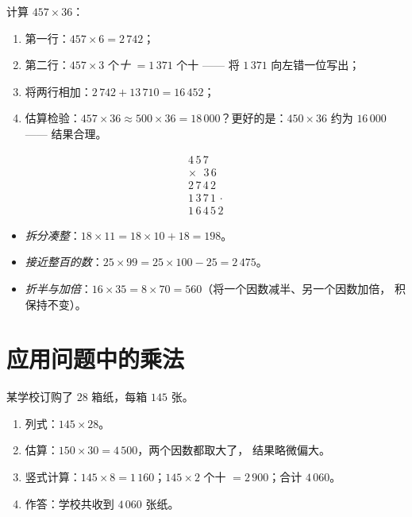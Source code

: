\begin{method}[两位数的竖式乘法]\label{met:g4:mult:column}
计算 $457 \times 36$：
\begin{enumerate}
  \item 第一行：$457 \times 6 = 2\,742$；
  \item 第二行：$457 \times 3$ 个\emph{十} $= 1\,371$ 个十 ——
        将 $1\,371$ 向左错一位写出；
  \item 将两行相加：$2\,742 + 13\,710 = 16\,452$；
  \item 估算检验：$457 \times 36 \approx 500 \times 36
        = 18\,000$？更好的是：$450 \times 36$ 约为 $16\,000$ ——
        结果合理。
\end{enumerate}
\[
\begin{array}{r}
4\,5\,7 \\
\times\ \ \,3\,6 \\
\hline
2\,7\,4\,2 \\
1\,3\,7\,1\,\cdot \\
\hline
1\,6\,4\,5\,2
\end{array}
\]
\end{method}

\begin{example}[口算技巧]\label{ex:g4:mult:tricks}
\begin{itemize}
  \item \emph{拆分凑整}：$18 \times 11 = 18 \times 10
        + 18 = 198$。
  \item \emph{接近整百的数}：$25 \times 99 = 25 \times 100 -
        25 = 2\,475$。
  \item \emph{折半与加倍}：$16 \times 35 = 8 \times 70 =
        560$（将一个因数减半、另一个因数加倍，
        积保持不变）。
\end{itemize}
\end{example}

\section{应用问题中的乘法}

\begin{example}\label{ex:g4:mult:problem}
某学校订购了 $28$ 箱纸，每箱 $145$ 张。
\begin{enumerate}
  \item 列式：$145 \times 28$。
  \item 估算：$150 \times 30 = 4\,500$，两个因数都取大了，
        结果略微偏大。
  \item 竖式计算：$145 \times 8 = 1\,160$；$145 \times 2$ 个十
        $= 2\,900$；合计 $4\,060$。
  \item 作答：学校共收到 $4\,060$ 张纸。
\end{enumerate}
\end{example}

